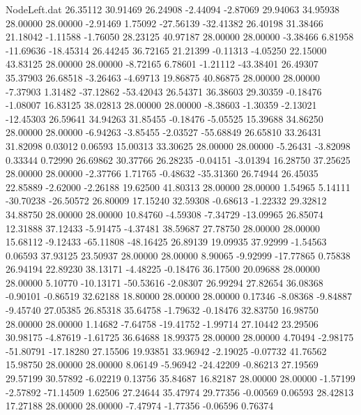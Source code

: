 \begin{filecontents}{NodeLeft.dat}
  26.35112   30.91469   26.24908    -2.44094   -2.87069   29.94063   34.95938   28.00000   28.00000   -2.91469    1.75092  -27.56139  -32.41382
  26.40198   31.38466   21.18042    -1.11588   -1.76050   28.23125   40.97187   28.00000   28.00000   -3.38466    6.81958  -11.69636  -18.45314
  26.44245   36.72165   21.21399    -0.11313   -4.05250   22.15000   43.83125   28.00000   28.00000   -8.72165    6.78601   -1.21112  -43.38401
  26.49307   35.37903   26.68518    -3.26463   -4.69713   19.86875   40.86875   28.00000   28.00000   -7.37903    1.31482  -37.12862  -53.42043
  26.54371   36.38603   29.30359    -0.18476   -1.08007   16.83125   38.02813   28.00000   28.00000   -8.38603   -1.30359   -2.13021  -12.45303
  26.59641   34.94263   31.85455    -0.18476   -5.05525   15.39688   34.86250   28.00000   28.00000   -6.94263   -3.85455   -2.03527  -55.68849
  26.65810   33.26431   31.82098     0.03012    0.06593   15.00313   33.30625   28.00000   28.00000   -5.26431   -3.82098    0.33344    0.72990
  26.69862   30.37766   26.28235    -0.04151   -3.01394   16.28750   37.25625   28.00000   28.00000   -2.37766    1.71765   -0.48632  -35.31360
  26.74944   26.45035   22.85889    -2.62000   -2.26188   19.62500   41.80313   28.00000   28.00000    1.54965    5.14111  -30.70238  -26.50572
  26.80009   17.15240   32.59308    -0.68613   -1.22332   29.32812   34.88750   28.00000   28.00000   10.84760   -4.59308   -7.34729  -13.09965
  26.85074   12.31888   37.12433    -5.91475   -4.37481   38.59687   27.78750   28.00000   28.00000   15.68112   -9.12433  -65.11808  -48.16425
  26.89139   19.09935   37.92999    -1.54563    0.06593   37.93125   23.50937   28.00000   28.00000    8.90065   -9.92999  -17.77865    0.75838
  26.94194   22.89230   38.13171    -4.48225   -0.18476   36.17500   20.09688   28.00000   28.00000    5.10770  -10.13171  -50.53616   -2.08307
  26.99294   27.82654   36.08368    -0.90101   -0.86519   32.62188   18.80000   28.00000   28.00000    0.17346   -8.08368   -9.84887   -9.45740
  27.05385   26.85318   35.64758    -1.79632   -0.18476   32.83750   16.98750   28.00000   28.00000    1.14682   -7.64758  -19.41752   -1.99714
  27.10442   23.29506   30.98175    -4.87619   -1.61725   36.64688   18.99375   28.00000   28.00000    4.70494   -2.98175  -51.80791  -17.18280
  27.15506   19.93851   33.96942    -2.19025   -0.07732   41.76562   15.98750   28.00000   28.00000    8.06149   -5.96942  -24.42209   -0.86213
  27.19569   29.57199   30.57892    -6.02219    0.13756   35.84687   16.82187   28.00000   28.00000   -1.57199   -2.57892  -71.14509    1.62506
  27.24644   35.47974   29.77356    -0.00569    0.06593   28.42813   17.27188   28.00000   28.00000   -7.47974   -1.77356   -0.06596    0.76374

\end{filecontents}
